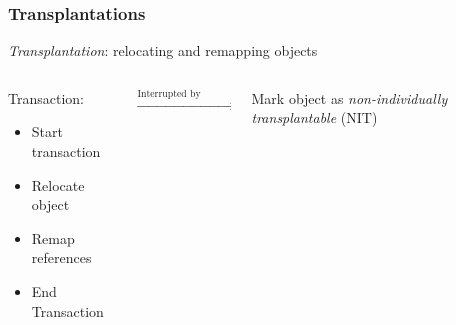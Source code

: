 \documentclass{beamer}
\newcommand{\linespace}{\vskip 0.25cm}
\begin{document}
\begin{frame}

\frametitle{Transplantations}

\emph{Transplantation}: relocating and remapping objects

\linespace
\linespace

\begin{columns}
\begin{column}{0.33\textwidth}

Transaction:
\begin{itemize}
\item Start transaction
\item Relocate object
\item Remap references
\item End Transaction
\end{itemize}

\end{column}
\begin{column}{0.32\textwidth}

$\xrightarrow{\text{Interrupted by application}}$

\end{column}
\begin{column}{0.3\textwidth}

Mark object as \emph{non-individually transplantable} (NIT)

\end{column}
\end{columns}

\end{frame}
\end{document}
